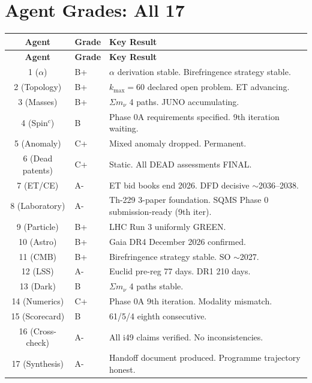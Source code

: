 \documentclass[11pt,a4paper]{article}
\begin{document}
\part{Agent Grades: All 17}

\begin{center}
\begin{longtable}{clp{9cm}}
\toprule
\textbf{Agent} & \textbf{Grade} & \textbf{Key Result} \\
\midrule
\endfirsthead
\toprule
\textbf{Agent} & \textbf{Grade} & \textbf{Key Result} \\
\midrule
\endhead
1 ($\alpha$) & B+ & $\alpha$ derivation stable. Birefringence strategy stable. \\
2 (Topology) & B+ & $k_{\max} = 60$ declared open problem. ET advancing. \\
3 (Masses) & B+ & $\Sigma m_\nu$ 4 paths. JUNO accumulating. \\
4 (Spin$^c$) & B & Phase 0A requirements specified. 9th iteration waiting. \\
5 (Anomaly) & C+ & Mixed anomaly dropped. Permanent. \\
6 (Dead patents) & C+ & Static. All DEAD assessments FINAL. \\
7 (ET/CE) & A- & ET bid books end 2026. DFD decisive $\sim$2036--2038. \\
8 (Laboratory) & A- & Th-229 3-paper foundation. SQMS Phase 0 submission-ready (9th iter). \\
9 (Particle) & B+ & LHC Run 3 uniformly GREEN. \\
10 (Astro) & B+ & Gaia DR4 December 2026 confirmed. \\
11 (CMB) & B+ & Birefringence strategy stable. SO $\sim$2027. \\
12 (LSS) & A- & Euclid pre-reg 77 days. DR1 210 days. \\
13 (Dark) & B & $\Sigma m_\nu$ 4 paths stable. \\
14 (Numerics) & C+ & Phase 0A 9th iteration. Modality mismatch. \\
15 (Scorecard) & B & 61/5/4 eighth consecutive. \\
16 (Cross-check) & A- & All i49 claims verified. No inconsistencies. \\
17 (Synthesis) & A- & Handoff document produced. Programme trajectory honest. \\
\bottomrule
\end{longtable}
\end{center}
\end{document}
